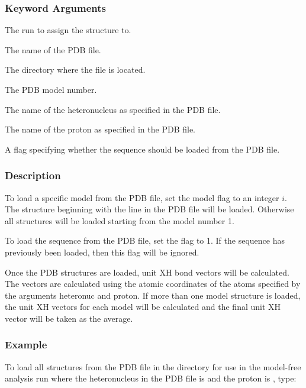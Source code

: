   
 \subsubsection{Keyword Arguments} 

   The run to assign the structure to.   

   The name of the PDB file.   

   The directory where the file is located.   

   The PDB model number.   

   The name of the heteronucleus as specified in the PDB file.   

   The name of the proton as specified in the PDB file.   

   A flag specifying whether the sequence should be loaded from the PDB file.  

  

  
 \subsubsection{Description} 

 To load a specific model from the PDB file, set the model flag to an integer $i$.  The structure beginning with the line  in the PDB file will be loaded.  Otherwise all structures will be loaded starting from the model number 1. 
  

 To load the sequence from the PDB file, set the  flag to 1.  If the sequence has previously been loaded, then this flag will be ignored. 
  

 Once the PDB structures are loaded, unit XH bond vectors will be calculated.  The vectors are calculated using the atomic coordinates of the atoms specified by the arguments heteronuc and proton.  If more than one model structure is loaded, the unit XH vectors for each model will be calculated and the final unit XH vector will be taken as the average. 
  

  
 \subsubsection{Example} 

 To load all structures from the PDB file  in the directory  for use in the model-free analysis run  where the heteronucleus in the PDB file is  and the proton is , type: 
  

